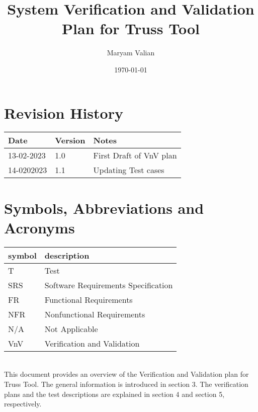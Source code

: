 \documentclass[12pt, titlepage]{article}
\begin{document}
\title{ System Verification and Validation Plan for Truss Tool} 
\author{Maryam Valian}
\date{\today}
	
\maketitle


\section{Revision History}

\begin{tabularx}{\textwidth}{p{3cm}p{2cm}X}
\toprule {\bf Date} & {\bf Version} & {\bf Notes}\\
\midrule
13-02-2023 & 1.0 & First Draft of VnV plan\\
14-0202023 & 1.1& Updating Test cases   \\
\bottomrule
\end{tabularx}

\newpage

\tableofcontents

\newpage

\section{Symbols, Abbreviations and Acronyms}

\renewcommand{\arraystretch}{1.2}
\begin{tabular}{l l} 
  \toprule		
  \textbf{symbol} & \textbf{description}\\
  \midrule 
  T & Test\\
  SRS & Software Requirements Specification\\
  FR & Functional Requirements\\
  NFR & Nonfunctional Requirements\\
  N/A & Not Applicable\\
  VnV & Verification and Validation\\
  
\bottomrule
\end{tabular}\\


\newpage
This document provides an overview of the Verification and Validation
 plan for Truss Tool. The general information is introduced in section 3. The verification plans and the test descriptions are explained in section 4 and section 5, respectively.
\end{document}
